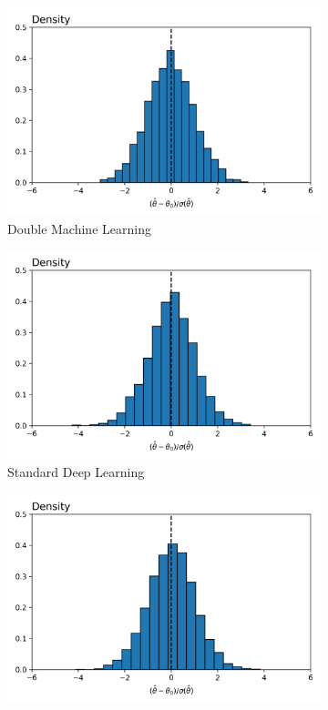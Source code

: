 \documentclass[a4paper,12pt]{article}
\begin{document}
\begin{figure}[htbp]
\centering
\begin{subfigure}{.32\textwidth}
    \centering
    \includegraphics[width=.95\linewidth]{figures/framework/dml_original.png}
    \caption{Double Machine Learning}
    \label{fig:overfittails}
\end{subfigure}
\begin{subfigure}{.32\textwidth}
    \centering
    \includegraphics[width=.95\linewidth]{figures/framework/dml_standard_nn.png}
        \caption{Standard Deep Learning}
    \label{fig:wrongspace}
\end{subfigure}
\begin{subfigure}{.32\textwidth}
    \centering
    \includegraphics[width=.95\linewidth]{figures/framework/dml_linear_comp.png}

\end{subfigure}
\end{figure}
\end{document}
